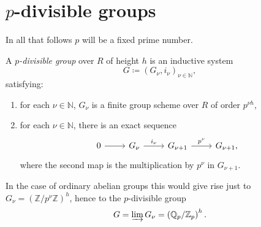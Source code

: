 \documentclass[../Main]{subfiles}
\begin{document}
\section{$p$-divisible groups}
In all that follows $p$ will be a fixed prime number.

\begin{defn}
	A {\em $p$-divisible group} over $R$ of height $h$ is an inductive system
	\begin{equation}
	G \coloneqq \left(G_\nu, i_\nu\right)_{\nu \in \mathbb{N}}
	,\end{equation} 
	satisfying:
	\begin{enumerate}
		\item for each $\nu \in \mathbb{N}$, $G_\nu$ is a finite group scheme over $R$
			of order $p^{\nu h}$,
		\item for each $\nu \in \mathbb{N}$, there is an exact sequence
			\begin{equation}
			\begin{tikzcd}
				0 \arrow[r, "", rightarrow] &
				G_\nu \arrow[r, "i_\nu", rightarrow] &
				G_{\nu + 1} \arrow[r, "p^\nu", rightarrow] &
				G_{\nu + 1} 
			,\end{tikzcd}
			\end{equation}
			where the second map is the multiplication by $p^\nu$ in $G_{\nu + 1}$.
	\end{enumerate}
\end{defn}

\begin{rem}[]
	In the case of ordinary abelian groups this would give rise just to 
	$G_\nu = \left( \mathbb{Z}/p^\nu\mathbb{Z} \right)^h$, hence to the $p$-divisible group
	\begin{equation}
		G = \varinjlim G_\nu = \left( \mathbb{Q}_p / \mathbb{Z}_p \right)^h
	.\end{equation} 
\end{rem}
\end{document}
